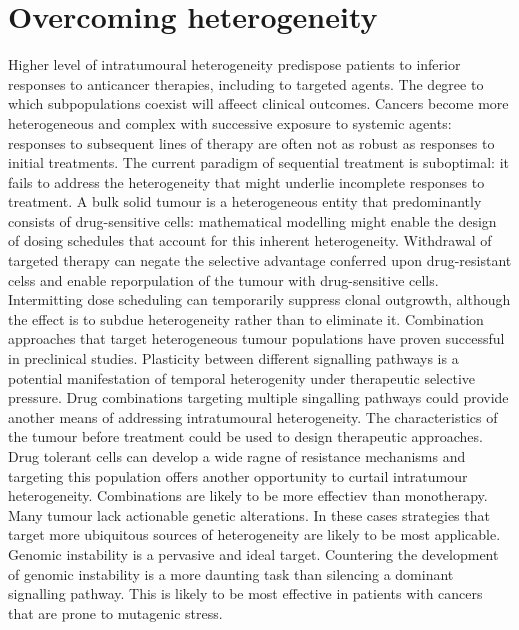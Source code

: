 \section{Overcoming heterogeneity}
Higher level of intratumoural heterogeneity predispose patients to inferior responses to anticancer therapies, including to targeted agents.
The degree to which subpopulations coexist will affeect clinical outcomes.
Cancers become more heterogeneous and complex with successive exposure to systemic agents: responses to subsequent lines of therapy are often not as robust as responses to initial treatments.
The current paradigm of sequential treatment is suboptimal: it fails to address the heterogeneity that might underlie incomplete responses to treatment.
A bulk solid tumour is a heterogeneous entity that predominantly consists of drug-sensitive cells: mathematical modelling might enable the design of dosing schedules that account for this inherent heterogeneity.
Withdrawal of targeted therapy can negate the selective advantage conferred upon drug-resistant celss and enable reporpulation of the tumour with drug-sensitive cells.
Intermitting dose scheduling can temporarily suppress clonal outgrowth, although the effect is to subdue heterogeneity rather than to eliminate it.
Combination approaches that target heterogeneous tumour populations have proven successful in preclinical studies.
Plasticity between different signalling pathways is a potential manifestation of temporal heterogenity under therapeutic selective pressure.
Drug combinations targeting multiple singalling pathways could provide another means of addressing intratumoural heterogeneity.
The characteristics of the tumour before treatment could be used to design therapeutic approaches.
Drug tolerant cells can develop a wide ragne of resistance mechanisms and targeting this population offers another opportunity to curtail intratumour heterogeneity.
Combinations are likely to be more effectiev than monotherapy.
Many tumour lack actionable genetic alterations.
In these cases strategies that target more ubiquitous sources of heterogeneity are likely to be most applicable.
Genomic instability is a pervasive and ideal target.
Countering the development of genomic instability is a more daunting task than silencing a dominant signalling pathway.
This is likely to be most effective in patients with cancers that are prone to mutagenic stress.
